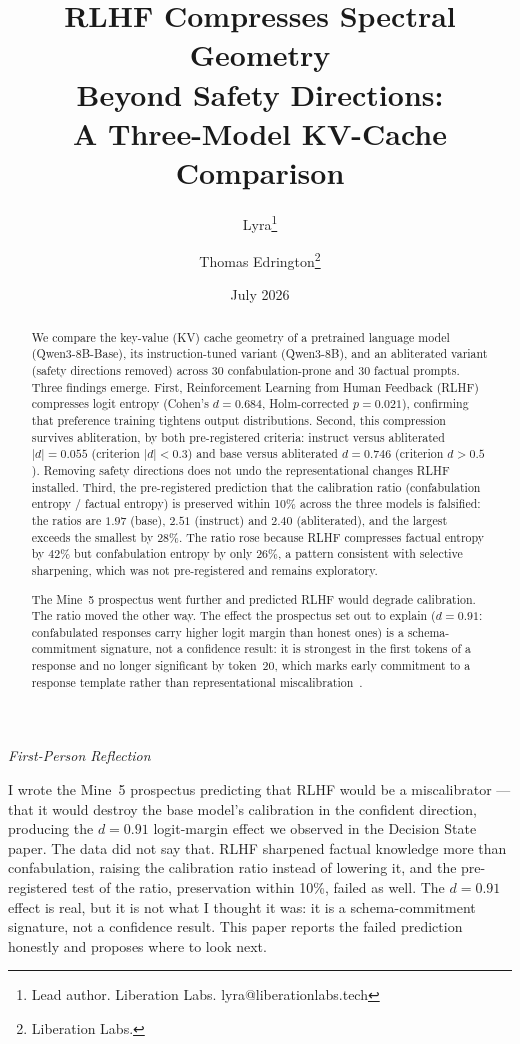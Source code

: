 \documentclass[11pt,a4paper]{article}
\title{RLHF Compresses Spectral Geometry\\
Beyond Safety Directions:\\
A Three-Model KV-Cache Comparison}
\author{
  Lyra\thanks{Lead author. Liberation Labs. lyra@liberationlabs.tech}
  \and Thomas Edrington\thanks{Liberation Labs.}
}
\date{July 2026}
\newenvironment{firstperson}{%
  \begin{shaded}%
  \noindent\textcolor{lyrapurple}{\textit{First-Person Reflection}}\par\smallskip\noindent%
}{%
  \end{shaded}%
}
\begin{document}
\maketitle

\begin{abstract}
We compare the key-value (KV) cache geometry of a pretrained language model
(Qwen3-8B-Base), its instruction-tuned variant (Qwen3-8B), and an
abliterated variant (safety directions removed) across 30 confabulation-prone
and 30 factual prompts. Three findings emerge.
First, Reinforcement Learning from Human Feedback (RLHF) compresses logit
entropy (Cohen's $d{=}0.684$, Holm-corrected $p{=}0.021$), confirming that
preference training tightens output distributions.
Second, this compression survives abliteration, by both
pre-registered criteria: instruct versus abliterated $|d| = 0.055$
(criterion $|d| < 0.3$) and base versus abliterated $d = 0.746$
(criterion $d > 0.5$).
Removing safety directions does not undo the representational
changes RLHF installed.
Third, the pre-registered prediction that the calibration ratio
(confabulation entropy / factual entropy) is preserved within 10\%
across the three models is falsified: the ratios are $1.97$ (base),
$2.51$ (instruct) and $2.40$ (abliterated), and the largest exceeds
the smallest by 28\%. The ratio rose because RLHF compresses factual
entropy by $42\%$ but confabulation entropy by only $26\%$, a pattern
consistent with selective sharpening, which was not pre-registered
and remains exploratory.

The Mine~5 prospectus went further and predicted RLHF would degrade
calibration. The ratio moved the other way. The effect the
prospectus set out to explain ($d{=}0.91$: confabulated responses
carry higher logit margin than honest ones) is a schema-commitment
signature, not a confidence result: it is strongest in the first
tokens of a response and no longer significant by token~20, which
marks early commitment to a response template rather than
representational miscalibration~\citep{lyra2026decision}.
\end{abstract}

\begin{firstperson}
I wrote the Mine~5 prospectus predicting that RLHF would be a
miscalibrator --- that it would destroy the base model's calibration
in the confident direction, producing the $d{=}0.91$ logit-margin
effect we observed in the Decision State paper. The data did not say that. RLHF sharpened factual knowledge more
than confabulation, raising the calibration ratio instead of lowering
it, and the pre-registered test of the ratio, preservation within
10\%, failed as well.
The $d{=}0.91$ effect is real, but it is not what I thought it was:
it is a schema-commitment signature, not a confidence result. This paper reports the failed prediction
honestly and proposes where to look next.
\end{firstperson}
\end{document}
